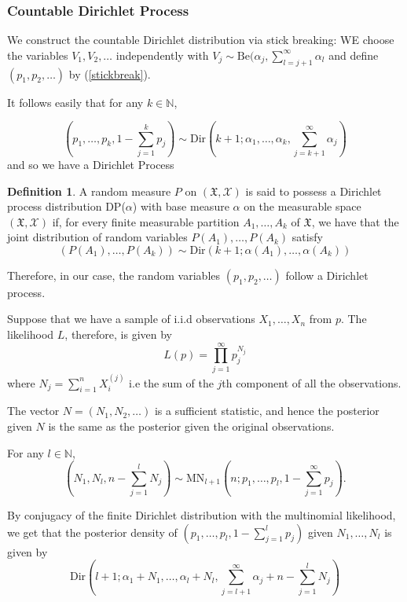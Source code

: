 \documentclass[a4paper,11pt]{article}
\theoremstyle{theorem}
\theoremstyle{definition}
\newtheorem{defn}{Definition}[section]
\theoremstyle{remark}
\begin{document}
\subsubsection{Countable Dirichlet Process}

We construct the countable Dirichlet distribution via stick breaking:
WE choose the variables $V_1, V_2, \dotsc$ independently with $V_j \sim \text{Be}(\alpha_j, \sum_{l=j+1}^{\infty}{\alpha_l}$ and define $(p_1, p_2, \dotsc )$ by (\ref{stickbreak}).

It follows easily that for any $k \in \mathbb{N}$,

\begin{equation}
\left(p_1, \dotsc, p_k, 1 - \sum_{j=1}^{k}{p_j}\right) \sim \text{Dir}\left(k+1; \alpha_1, \dotsc, \alpha_k, \sum_{j=k+1}^{\infty}{\alpha_j}\right)
\end{equation}
and so we have a Dirichlet Process

\begin{defn}
A random measure $P$ on $(\mathfrak{X}, \mathcal{X})$ is said to possess a Dirichlet process distribution DP($\alpha$) with base measure $\alpha$ on the measurable space $(\mathfrak{X}, \mathcal{X})$ if, for every finite measurable partition $A_1, \dotsc, A_k$ of $\mathfrak{X}$, we have that the joint distribution of random variables $P(A_1), \dotsc, P(A_k)$ satisfy
\[
(P(A_1), \dotsc, P(A_k)) \sim \text{Dir}\left(k+1; \alpha(A_1), \dotsc, \alpha(A_k)\right) 
\]
\end{defn}

Therefore, in our case, the random variables $(p_1, p_2, \dotsc )$ follow a Dirichlet process.

Suppose that we have a sample of i.i.d observations $X_1, \dotsc, X_n$ from $p$.
The likelihood $L$, therefore, is given by
\[
L(p) = \prod_{j=1}^{\infty}{p_{j}^{N_j}}
\]
where $N_j = \sum_{i=1}^{n}{X_{i}^{(j)}}$ i.e the sum of the $j$th component of all the observations.

The vector $N = (N_1, N_2, \dotsc)$ is a sufficient statistic, and hence the posterior given $N$ is the same as the posterior given the original observations.

For any $l \in \mathbb{N}$,
\begin{equation} \label{multiNom}
\left( N_1, N_l, n - \sum_{j=1}^{l}{N_j}\right) \sim \text{MN}_{l+1}\left(n; p_1, \dotsc, p_l, 1 - \sum_{j=1}^{\infty}{p_j}\right).
\end{equation}

By conjugacy of the finite Dirichlet distribution with the multinomial likelihood, we get that the posterior density of $(p_1, \dotsc, p_l, 1- \sum_{j=1}^{l}{p_j})$ given $N_1, \dotsc, N_l$ is given by
\[
\text{Dir}\left(l+1; \alpha_1 + N_1, \dotsc, \alpha_l + N_l, \sum_{j=l+1}^{\infty}{\alpha_j} + n - \sum_{j=1}^{l}{N_j}\right)
\]
\end{document}
